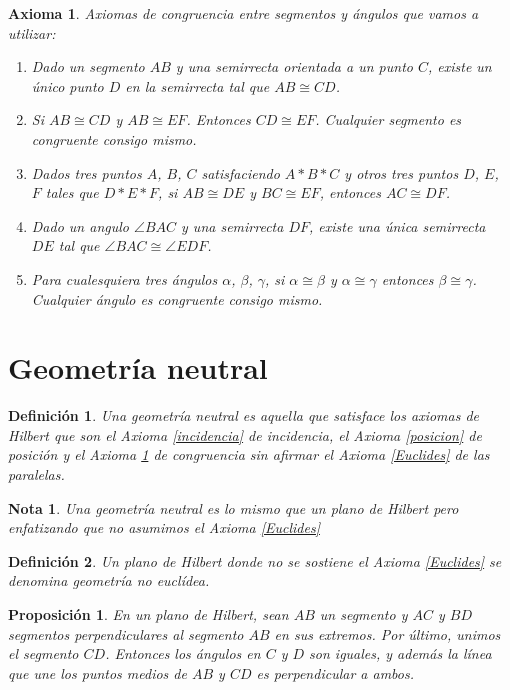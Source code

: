 \documentclass[a4paper]{amsart}
\theoremstyle{plain}
\newtheorem{definition}{Definición}
\newtheorem{proposition}{Proposición}
\newtheorem{axiom}{Axioma}
\newtheorem{nota}{Nota}
\begin{document}
\begin{axiom}\label{congruencia}
Axiomas de congruencia entre segmentos y ángulos que vamos a utilizar:
\begin{enumerate}
\item [(C1)] Dado un segmento $AB$ y una semirrecta orientada a un punto $C$, existe un único punto $D$ en la semirrecta tal que $AB \cong CD$.
\item [(C2)] Si $AB \cong CD$ y $AB \cong EF$. Entonces $CD \cong EF$. Cualquier segmento es congruente consigo mismo.
\item [(C3)] Dados tres puntos $A$, $B$, $C$ satisfaciendo $A*B*C$ y otros tres puntos $D$, $E$, $F$ tales que $D*E*F$, si $AB \cong DE$ y $BC \cong EF$, entonces $AC \cong DF$.
\item [(C4)] Dado un angulo $\angle BAC$ y una semirrecta $DF$, existe una única semirrecta $DE$ tal que $\angle BAC \cong \angle EDF$.
\item [(C5)] Para cualesquiera tres ángulos $\alpha$, $\beta$, $\gamma$, si $\alpha \cong \beta$ y $\alpha \cong \gamma$ entonces $\beta \cong \gamma$. Cualquier ángulo es congruente consigo mismo.
\end{enumerate}
\end{axiom}

\section{Geometría neutral}

\begin{definition}
Una geometría neutral es aquella que satisface los axiomas de Hilbert que son el Axioma \ref{incidencia} de incidencia, el Axioma \ref{posicion} de posición y el Axioma \ref{congruencia} de congruencia sin afirmar el Axioma \ref{Euclides} de las paralelas.
\end{definition}

\begin{nota}
Una geometría neutral es lo mismo que un plano de Hilbert pero enfatizando que no asumimos el Axioma \ref{Euclides}
\end{nota}

\begin{definition}
Un plano de Hilbert donde no se sostiene el Axioma \ref{Euclides} se denomina geometría no euclídea.
\end{definition}

\begin{proposition}\label{Saccheri}
En un plano de Hilbert, sean $AB$ un segmento y $AC$ y $BD$ segmentos perpendiculares al segmento $AB$ en sus extremos. Por último, unimos el segmento $CD$. Entonces los ángulos en $C$ y $D$ son iguales, y además la línea que une los puntos medios de $AB$ y $CD$ es perpendicular a ambos.
\end{proposition}
\end{document}
